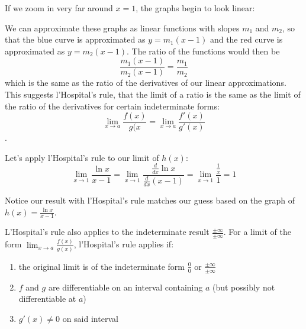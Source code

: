 
If we zoom in very far around $x=1$, the graphs begin to look linear:


We can approximate these graphs as linear functions with slopes $m_1$ and $m_2$, so that the blue curve is approximated as $y=m_1(x-1)$ and the red curve is approximated as $y=m_2(x-1)$. The ratio of the functions would then be $$\frac{m_1(x-1)}{m_2(x-1)}=\frac{m_1}{m_2}$$ which is the same as the ratio of the derivatives of our linear approximations. This suggests l'Hospital's rule, that the limit of a ratio is the same as the limit of the ratio of the derivatives for certain indeterminate forms: $$\lim_{x\to a}\frac{f(x)}{g(x}=\lim_{x\to a}\frac{f'(x)}{g'(x)}$$.

Let's apply l'Hospital's rule to our limit of $h(x)$:
$$\lim_{x\to 1}\frac{\ln{x}}{x-1}=\lim_{x \to 1}\frac{\frac{d}{dx}\ln{x}}{\frac{d}{dx}(x-1)}=\lim_{x \to 1}\frac{\frac{1}{x}}{1}=1$$

Notice our result with l'Hospital's rule matches our guess based on the graph of $h(x) = \frac{\ln{x}}{x-1}$. 

L'Hospital's rule also applies to the indeterminate result $\frac{\pm \infty}{\pm \infty}$. For a limit of the form $\lim_{x\to a}\frac{f(x)}{g(x)}$, l'Hospital's rule applies if:
\begin{enumerate}
    \item the original limit is of the indeterminate form $\frac{0}{0}$ or $\frac{\pm \infty}{\pm \infty}$
    \item $f$ and $g$ are differentiable on an interval containing $a$ (but possibly not differentiable at $a$)
    \item $g'(x) \neq 0$ on said interval
\end{enumerate}



